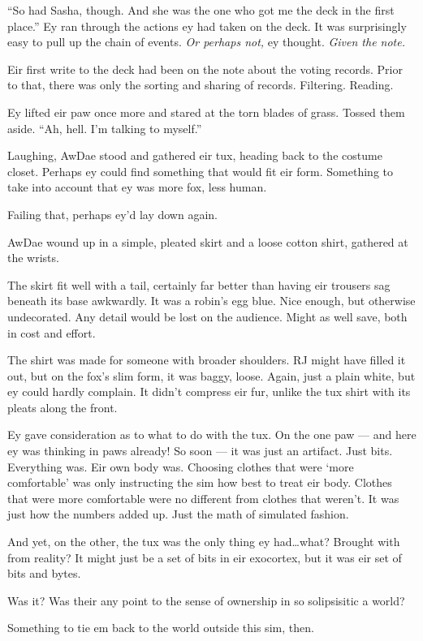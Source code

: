``So had Sasha, though. And she was the one who got me the deck in the first place.'' Ey ran through the actions ey had taken on the deck. It was surprisingly easy to pull up the chain of events. \emph{Or perhaps not,} ey thought. \emph{Given the note.}

Eir first write to the deck had been on the note about the voting records. Prior to that, there was only the sorting and sharing of records. Filtering. Reading.

Ey lifted eir paw once more and stared at the torn blades of grass. Tossed them aside. ``Ah, hell. I'm talking to myself.''

Laughing, AwDae stood and gathered eir tux, heading back to the costume closet. Perhaps ey could find something that would fit eir form. Something to take into account that ey was more fox, less human.

Failing that, perhaps ey'd lay down again.

AwDae wound up in a simple, pleated skirt and a loose cotton shirt, gathered at the wrists.

The skirt fit well with a tail, certainly far better than having eir trousers sag beneath its base awkwardly. It was a robin's egg blue. Nice enough, but otherwise undecorated. Any detail would be lost on the audience. Might as well save, both in cost and effort.

The shirt was made for someone with broader shoulders. RJ might have filled it out, but on the fox's slim form, it was baggy, loose. Again, just a plain white, but ey could hardly complain. It didn't compress eir fur, unlike the tux shirt with its pleats along the front.

Ey gave consideration as to what to do with the tux. On the one paw --- and here ey was thinking in paws already! So soon --- it was just an artifact. Just bits. Everything was. Eir own body was. Choosing clothes that were `more comfortable' was only instructing the sim how best to treat eir body. Clothes that were more comfortable were no different from clothes that weren't. It was just how the numbers added up. Just the math of simulated fashion.

And yet, on the other, the tux was the only thing ey had\ldots{}what? Brought with from reality? It might just be a set of bits in eir exocortex, but it was eir set of bits and bytes.

Was it? Was their any point to the sense of ownership in so solipsisitic a world?

Something to tie em back to the world outside this sim, then.

